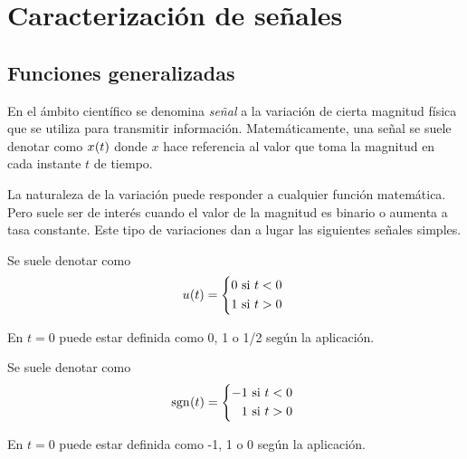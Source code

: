 \chapter{Caracterización de señales}


\section{Funciones generalizadas}

En el ámbito científico se denomina \emph{señal} a la variación de cierta magnitud física que se utiliza para transmitir información.
Matemáticamente, una señal se suele denotar como $\fx[x]{t}$ donde $x$ hace referencia al valor que toma la magnitud en cada instante $t$ de tiempo.

La naturaleza de la variación puede responder a cualquier función matemática.
Pero suele ser de interés cuando el valor de la magnitud es binario o aumenta a tasa constante.
Este tipo de variaciones dan a lugar las siguientes señales simples.


Se suele denotar como
\begin{equation*}
    \fx[u]{t} =
    \left\{
    \begin{aligned}
        0 \text{ si $t<0$ }
        \\
        1 \text{ si $t>0$ }
    \end{aligned}
    \right.
\end{equation*}

En $t=0$ puede estar definida como 0, 1 o 1/2 según la aplicación.

\begin{center}
    \def\svgwidth{0.6\linewidth}
    
\end{center}


Se suele denotar como
\begin{equation*}
    \fx[\sgn]{t} =
    \left\{
    \begin{aligned}
        -1 \text{ si $t<0$ }
        \\
        1 \text{ si $t>0$ }
    \end{aligned}
    \right.
\end{equation*} 

En $t=0$ puede estar definida como -1, 1 o 0 según la aplicación.

\begin{center}
    \def\svgwidth{0.6\linewidth}
    
\end{center}

